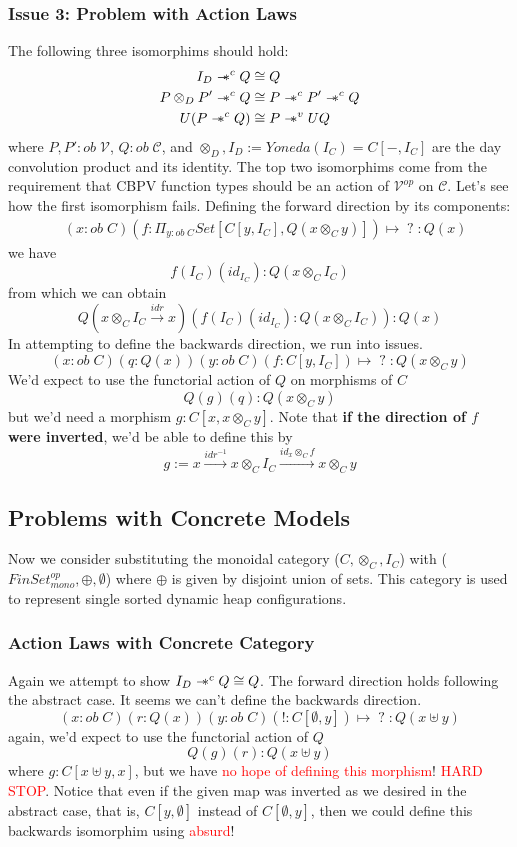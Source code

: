 \documentclass{article}
\newcommand{\sep}{\mathrel{-\mkern-6mu*}}
\newcommand{\red}[1]{\textcolor{red}{#1}}
\begin{document}
\subsubsection{Issue 3: Problem with Action Laws}
The following three isomorphims should hold:
\begin{align*}
    I_{D} \sep^{c} Q &\cong Q\\
    P \otimes_D P' \sep^{c} Q &\cong P \sep^{c} P' \sep^{c} Q\\
    U(P \sep^{c}Q) &\cong P \sep^{v} UQ
\end{align*}
where $P , P' : ob \;\mathcal{V}$, $Q : ob \; \mathcal{C}$, and $\otimes_D,I_D:= Yoneda(I_C) = C[- , I_C]$ are the day convolution product and its identity.
The top two isomorphims come from the requirement that CBPV function types should be an action 
of $\mathcal{V}^{op}$ on $\mathcal{C}$. Let's see how the first isomorphism fails. 
Defining the forward direction by its components:
\begin{align*}
    &(x : ob \; C)(f : \Pi_{y : ob \;C}Set[C[y , I_C], Q(x \otimes_C y)]) \mapsto \;?\; : Q(x)
\end{align*}
we have
\[
  f(I_C)(id_{I_C}) : Q(x \otimes_C I_C)  
\]
from which we can obtain
\[
  Q(x \otimes_C I_C \xrightarrow{idr} x)(f(I_C)(id_{I_C}) : Q(x \otimes_C I_C)) : Q(x)  
\]
In attempting to define the backwards direction, we run into issues.
\[
    (x : ob \; C)(q : Q(x))(y : ob \;C)(f : C[y , I_C]) \mapsto \;?\; : Q (x \otimes_C y)    
\]
We'd expect to use the functorial action of $Q$ on morphisms of $C$
\[
    Q(g)(q) : Q(x \otimes_C y)
\]
but we'd need a morphism $g : C [ x , x\otimes_C y]$. 
Note that \textbf{if the direction of $f$ were inverted}, we'd be able to define this by 
\[
  g := x \xrightarrow{idr^{-1}} x \otimes_C I_C \xrightarrow{id_x \otimes_C f} x \otimes_C y  
\]

\subsection{Problems with Concrete Models}
Now we consider substituting the monoidal category ($C, \otimes_C , I_C$) with ($FinSet_{mono}^{op}, \oplus , \emptyset $)
where $\oplus$ is given by disjoint union of sets. 
This category is used to represent single sorted dynamic heap configurations. 

\subsubsection{Action Laws with Concrete Category}
Again we attempt to show $I_{D} \sep^{c} Q \cong Q$. The forward direction holds following the abstract case.
It seems we can't define the backwards direction.
\[
    (x : ob \;C)(r : Q(x))(y : ob \;C)(! : C[ \emptyset, y] ) \mapsto \; ? \; : Q(x \uplus y)
\]
again, we'd expect to use the functorial action of $Q$
\[
    Q(g)(r) : Q (x \uplus y)    
\]
where $g : C[x \uplus y , x]$, but we have \red{no hope of defining this morphism}! \red{HARD STOP}.
Notice that even if the given map was inverted as we desired in the abstract case, that is, $C[y , \emptyset]$ 
instead of $C[\emptyset , y]$, then we could define this backwards isomorphim using \red{absurd}!
\end{document}
